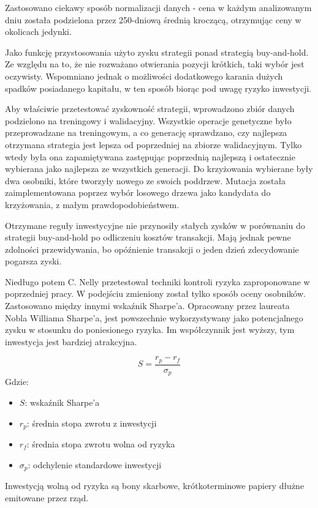 \documentclass[twoside]{iisthesis}
\begin{document}
Zastosowano ciekawy sposób normalizacji danych - cena w każdym analizowanym dniu została podzielona przez 250-dniową średnią kroczącą, otrzymując ceny w okolicach jedynki. 

Jako funkcję przystosowania użyto zysku strategii ponad strategią buy-and-hold. Ze względu na to, że nie rozważano otwierania pozycji krótkich, taki wybór jest oczywisty. Wspomniano jednak o możliwości dodatkowego karania dużych spadków posiadanego kapitału, w ten sposób biorąc pod uwagę ryzyko inwestycji.

Aby właściwie przetestować zyskowność strategii, wprowadzono zbiór danych podzielono na treningowy i walidacyjny. Wszystkie operacje genetyczne było przeprowadzane na treningowym, a co generację sprawdzano, czy najlepsza otrzymana strategia jest lepsza od poprzedniej na zbiorze walidacyjnym. Tylko wtedy była ona zapamiętywana zastępując poprzednią najlepszą i ostatecznie wybierana jako najlepsza ze wszystkich generacji. Do krzyżowania wybierane były dwa osobniki, które tworzyły nowego ze swoich poddrzew. Mutacja została zaimplementowana poprzez wybór losowego drzewa jako kandydata do krzyżowania, z małym prawdopodobieństwem.

Otrzymane reguły inwestycyjne nie przynosiły stałych zysków w porównaniu do strategii buy-and-hold po odliczeniu kosztów transakcji. Mają jednak pewne zdolności przewidywania, bo opóźnienie transakcji o jeden dzień zdecydowanie pogarsza zyski.

Niedługo potem C. Nelly \cite{Neely200369} przetestował techniki kontroli ryzyka zaproponowane w poprzedniej pracy. W podejściu zmieniony został tylko sposób oceny osobników. Zastosowano między innymi wskaźnik Sharpe'a. Opracowany przez laureata Nobla Williama Sharpe'a, jest powszechnie wykorzystywany jako potencjalnego zysku w stosunku do poniesionego ryzyka. Im współczynnik jest wyższy, tym inwestycja jest bardziej atrakcyjna.

\[S=\frac{r_{p} - r_{f}}{\sigma_{p}}\]
Gdzie:
\begin{itemize}[label=]
	\item $S$: wskaźnik Sharpe'a
	\item $r_p$: średnia stopa zwrotu z inwestycji
	\item $r_f$: średnia stopa zwrotu wolna od ryzyka
	\item $\sigma_p$: odchylenie standardowe inwestycji
\end{itemize}

Inwestycją wolną od ryzyka są bony skarbowe, krótkoterminowe papiery dłużne emitowane przez rząd.
\end{document}

